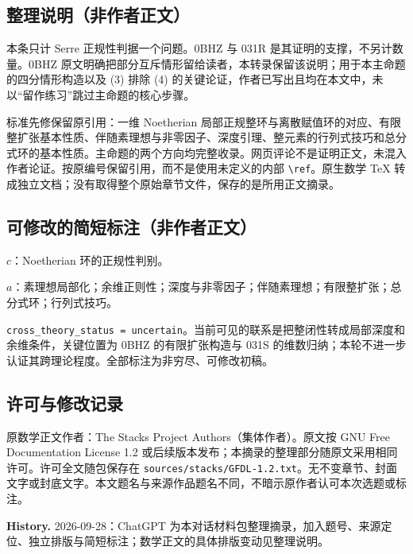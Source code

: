 \documentclass[UTF8,11pt]{ctexart}
\begin{document}
\subsection*{整理说明（非作者正文）}
本条只计 Serre 正规性判据一个问题。0BHZ 与 031R 是其证明的支撑，不另计数量。0BHZ 原文明确把部分互斥情形留给读者，本转录保留该说明；用于本主命题的四分情形构造以及 (3) 排除 (4) 的关键论证，作者已写出且均在本文中，未以“留作练习”跳过主命题的核心步骤。

标准先修保留原引用：一维 Noetherian 局部正规整环与离散赋值环的对应、有限整扩张基本性质、伴随素理想与非零因子、深度引理、整元素的行列式技巧和总分式环的基本性质。主命题的两个方向均完整收录。网页评论不是证明正文，未混入作者论证。按原编号保留引用，而不是使用未定义的内部 \verb|\ref|。原生数学 TeX 转成独立文档；没有取得整个原始章节文件，保存的是所用正文摘录。

\subsection*{可修改的简短标注（非作者正文）}
$c$：Noetherian 环的正规性判别。

$a$：素理想局部化；余维正则性；深度与非零因子；伴随素理想；有限整扩张；总分式环；行列式技巧。

\texttt{cross\_theory\_status = uncertain}。当前可见的联系是把整闭性转成局部深度和余维条件，关键位置为 0BHZ 的有限扩张构造与 031S 的维数归纳；本轮不进一步认证其跨理论程度。全部标注为非穷尽、可修改初稿。
\subsection*{许可与修改记录}
原数学正文作者：The Stacks Project Authors（集体作者）。原文按 GNU Free Documentation License 1.2 或后续版本发布；本摘录的整理部分随原文采用相同许可。许可全文随包保存在 \texttt{sources/stacks/GFDL-1.2.txt}。无不变章节、封面文字或封底文字。本文题名与来源作品题名不同，不暗示原作者认可本次选题或标注。

\textbf{History.} 2026-09-28：ChatGPT 为本对话材料包整理摘录，加入题号、来源定位、独立排版与简短标注；数学正文的具体排版变动见整理说明。
\end{document}
